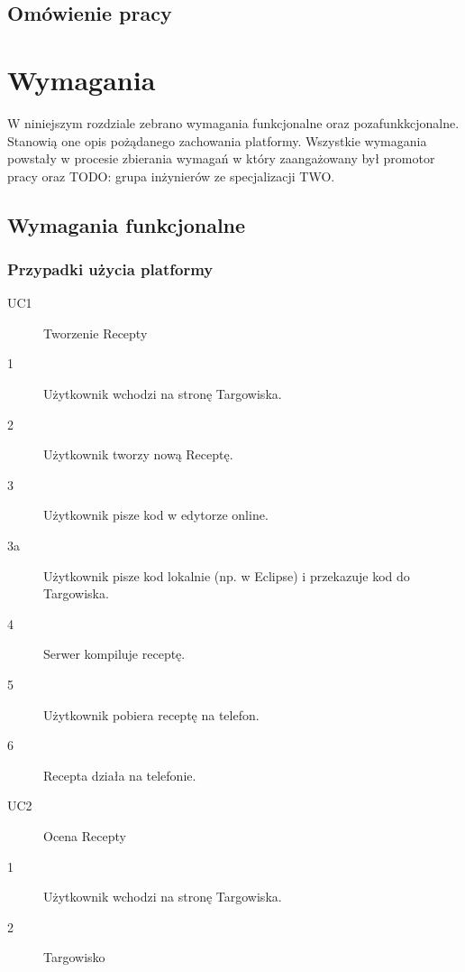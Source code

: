 \documentclass[11pt,a4paper,polish,thesis]{dcsbook}
\begin{document}
\section{Omówienie pracy}       %

\chapter{Wymagania}
W niniejszym rozdziale zebrano wymagania funkcjonalne oraz pozafunkkcjonalne. Stanowią one opis pożądanego zachowania platformy. Wszystkie wymagania powstały
w procesie zbierania wymagań w który zaangażowany był promotor pracy oraz TODO: grupa inżynierów ze specjalizacji TWO.
\section{Wymagania funkcjonalne}
\subsection{Przypadki użycia platformy} %
\begin{description}
\item[UC1] Tworzenie Recepty
\item[1] Użytkownik wchodzi na stronę Targowiska.
\item[2]Użytkownik tworzy nową Receptę.
\item[3]Użytkownik pisze kod w edytorze online.
\item[3a]Użytkownik pisze kod lokalnie (np. w Eclipse) i przekazuje kod do Targowiska.
\item[4]Serwer kompiluje receptę.
\item[5]Użytkownik pobiera receptę na telefon.
\item[6]Recepta działa na telefonie.

\item[UC2] Ocena Recepty
\item[1] Użytkownik wchodzi na stronę Targowiska.
\item[2] Targowisko  


\end{description}
\end{document}
